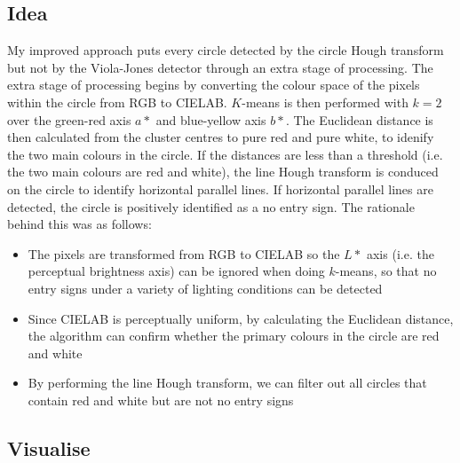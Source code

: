 \documentclass[twocolumn, 10pt, a4paper]{article}
\begin{document}
\subsection{Idea}

My improved approach puts every circle detected by the circle Hough transform but not by the Viola-Jones detector through an extra stage of processing.
The extra stage of processing begins by converting the colour space of the pixels within the circle from RGB to CIELAB.
$K$-means is then performed with $k = 2$ over the green-red axis $a*$ and blue-yellow axis $b*$.
The Euclidean distance is then calculated from the cluster centres to pure red and pure white, to idenify the two main colours in the circle.
If the distances are less than a threshold (i.e. the two main colours are red and white), the line Hough transform is conduced on the circle to identify horizontal parallel lines.
If horizontal parallel lines are detected, the circle is positively identified as a no entry sign.
The rationale behind this was as follows:
\begin{itemize}
  \item The pixels are transformed from RGB to CIELAB so the $L*$ axis (i.e. the perceptual brightness axis) can be ignored when doing $k$-means, so that no entry signs under a variety of lighting conditions can be detected
  \item Since CIELAB is perceptually uniform, by calculating the Euclidean distance, the algorithm can confirm whether the primary colours in the circle are red and white
  \item By performing the line Hough transform, we can filter out all circles that contain red and white but are not no entry signs
\end{itemize}

\subsection{Visualise}
\end{document}
